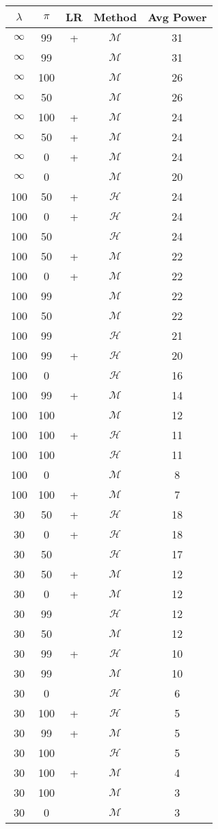 \centering \begin{tabular}{c|c|c|c|c}
$\lambda$	&$\pi$	&LR	&Method	&Avg Power\\\hline
$\infty$	&99	&+	&$\mathcal{M}$	&31\\
$\infty$	&99	&	&$\mathcal{M}$	&31\\
$\infty$	&100	&	&$\mathcal{M}$	&26\\
$\infty$	&50	&	&$\mathcal{M}$	&26\\
$\infty$	&100	&+	&$\mathcal{M}$	&24\\
$\infty$	&50	&+	&$\mathcal{M}$	&24\\
$\infty$	&0	&+	&$\mathcal{M}$	&24\\
$\infty$	&0	&	&$\mathcal{M}$	&20\\\hline
100	&50	&+	&$\mathcal{H}$	&24\\
100	&0	&+	&$\mathcal{H}$	&24\\
100	&50	&	&$\mathcal{H}$	&24\\
100	&50	&+	&$\mathcal{M}$	&22\\
100	&0	&+	&$\mathcal{M}$	&22\\
100	&99	&	&$\mathcal{M}$	&22\\
100	&50	&	&$\mathcal{M}$	&22\\
100	&99	&	&$\mathcal{H}$	&21\\
100	&99	&+	&$\mathcal{H}$	&20\\
100	&0	&	&$\mathcal{H}$	&16\\
100	&99	&+	&$\mathcal{M}$	&14\\
100	&100	&	&$\mathcal{M}$	&12\\
100	&100	&+	&$\mathcal{H}$	&11\\
100	&100	&	&$\mathcal{H}$	&11\\
100	&0	&	&$\mathcal{M}$	&8\\
100	&100	&+	&$\mathcal{M}$	&7\\\hline
30	&50	&+	&$\mathcal{H}$	&18\\
30	&0	&+	&$\mathcal{H}$	&18\\
30	&50	&	&$\mathcal{H}$	&17\\
30	&50	&+	&$\mathcal{M}$	&12\\
30	&0	&+	&$\mathcal{M}$	&12\\
30	&99	&	&$\mathcal{H}$	&12\\
30	&50	&	&$\mathcal{M}$	&12\\
30	&99	&+	&$\mathcal{H}$	&10\\
30	&99	&	&$\mathcal{M}$	&10\\
30	&0	&	&$\mathcal{H}$	&6\\
30	&100	&+	&$\mathcal{H}$	&5\\
30	&99	&+	&$\mathcal{M}$	&5\\
30	&100	&	&$\mathcal{H}$	&5\\
30	&100	&+	&$\mathcal{M}$	&4\\
30	&100	&	&$\mathcal{M}$	&3\\
30	&0	&	&$\mathcal{M}$	&3\\
\end{tabular}
